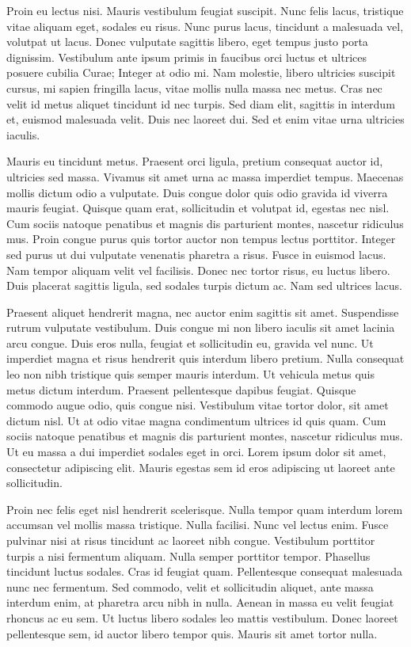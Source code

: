 \documentclass[a4paper]{article}
\begin{document}
Proin eu lectus nisi. Mauris vestibulum feugiat suscipit. Nunc felis lacus, tristique vitae aliquam eget, sodales eu risus. Nunc purus lacus, tincidunt a malesuada vel, volutpat ut lacus. Donec vulputate sagittis libero, eget tempus justo porta dignissim. Vestibulum ante ipsum primis in faucibus orci luctus et ultrices posuere cubilia Curae; Integer at odio mi. Nam molestie, libero ultricies suscipit cursus, mi sapien fringilla lacus, vitae mollis nulla massa nec metus. Cras nec velit id metus aliquet tincidunt id nec turpis. Sed diam elit, sagittis in interdum et, euismod malesuada velit. Duis nec laoreet dui. Sed et enim vitae urna ultricies iaculis.

Mauris eu tincidunt metus. Praesent orci ligula, pretium consequat auctor id, ultricies sed massa. Vivamus sit amet urna ac massa imperdiet tempus. Maecenas mollis dictum odio a vulputate. Duis congue dolor quis odio gravida id viverra mauris feugiat. Quisque quam erat, sollicitudin et volutpat id, egestas nec nisl. Cum sociis natoque penatibus et magnis dis parturient montes, nascetur ridiculus mus. Proin congue purus quis tortor auctor non tempus lectus porttitor. Integer sed purus ut dui vulputate venenatis pharetra a risus. Fusce in euismod lacus. Nam tempor aliquam velit vel facilisis. Donec nec tortor risus, eu luctus libero. Duis placerat sagittis ligula, sed sodales turpis dictum ac. Nam sed ultrices lacus.

Praesent aliquet hendrerit magna, nec auctor enim sagittis sit amet. Suspendisse rutrum vulputate vestibulum. Duis congue mi non libero iaculis sit amet lacinia arcu congue. Duis eros nulla, feugiat et sollicitudin eu, gravida vel nunc. Ut imperdiet magna et risus hendrerit quis interdum libero pretium. Nulla consequat leo non nibh tristique quis semper mauris interdum. Ut vehicula metus quis metus dictum interdum. Praesent pellentesque dapibus feugiat. Quisque commodo augue odio, quis congue nisi. Vestibulum vitae tortor dolor, sit amet dictum nisl. Ut at odio vitae magna condimentum ultrices id quis quam. Cum sociis natoque penatibus et magnis dis parturient montes, nascetur ridiculus mus. Ut eu massa a dui imperdiet sodales eget in orci. Lorem ipsum dolor sit amet, consectetur adipiscing elit. Mauris egestas sem id eros adipiscing ut laoreet ante sollicitudin.

Proin nec felis eget nisl hendrerit scelerisque. Nulla tempor quam interdum lorem accumsan vel mollis massa tristique. Nulla facilisi. Nunc vel lectus enim. Fusce pulvinar nisi at risus tincidunt ac laoreet nibh congue. Vestibulum porttitor turpis a nisi fermentum aliquam. Nulla semper porttitor tempor. Phasellus tincidunt luctus sodales. Cras id feugiat quam. Pellentesque consequat malesuada nunc nec fermentum. Sed commodo, velit et sollicitudin aliquet, ante massa interdum enim, at pharetra arcu nibh in nulla. Aenean in massa eu velit feugiat rhoncus ac eu sem. Ut luctus libero sodales leo mattis vestibulum. Donec laoreet pellentesque sem, id auctor libero tempor quis. Mauris sit amet tortor nulla.
\end{document}
